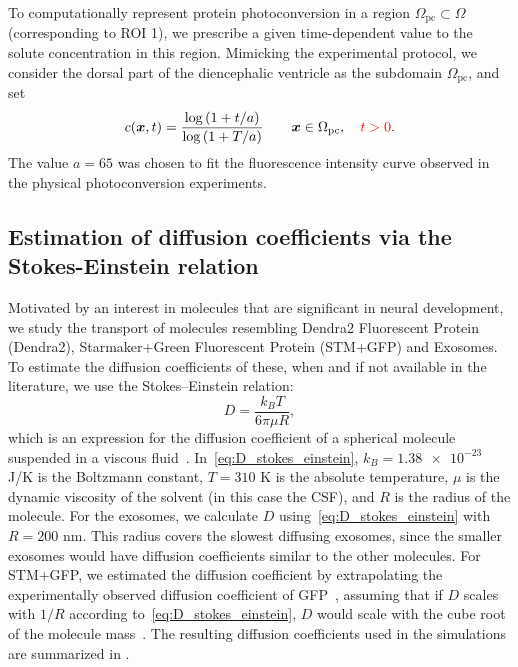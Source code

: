 \documentclass[fleqn]{wlscirep}
\newcommand{\xx}{\bm{x}}
\newcommand{\fixme}[1]{\textcolor{red}{#1}}
\begin{document}
To computationally represent protein photoconversion in a region $\Omega_{\mathrm{pc}} \subset \Omega$ (corresponding to ROI 1), we prescribe a given time-dependent value to the solute concentration in this region. 
Mimicking the experimental protocol, we consider the dorsal part of the diencephalic ventricle as the subdomain $\Omega_{\mathrm{pc}}$, and set
\begin{equation}
  c(\xx, t)=\frac{\log{(1+t/a)}}{\log{(1+T/a)}}
  \qquad \xx \in \Omega_{\mathrm{pc}}, \quad \fixme{t > 0}.
\label{eq:photoconversion_curve}
\end{equation}
The value $a=65$ was chosen to fit the fluorescence intensity curve observed in the physical photoconversion experiments.

\subsection*{Estimation of diffusion coefficients via the Stokes-Einstein relation}
Motivated by an interest in molecules that are significant in neural development, we study the transport of molecules resembling Dendra2 Fluorescent Protein (Dendra2), Starmaker+Green Fluorescent Protein (STM+GFP) and Exosomes.
To estimate the diffusion coefficients of these, when and if not available in the literature, we use the Stokes--Einstein relation:
\begin{equation}
    D = \frac{k_B T}{6\pi \mu R},
    \label{eq:D_stokes_einstein}
\end{equation}
which is an expression for the diffusion coefficient of a spherical molecule suspended in a viscous fluid~\cite{Einstein1905UberTeilchen}.
In~\eqref{eq:D_stokes_einstein}, $k_B = \num{1.38e-23}$ J/K is the Boltzmann constant, $T = 310$ K is the absolute temperature, $\mu$ is the dynamic viscosity of the solvent (in this case the CSF), and $R$ is the radius of the molecule.
For the exosomes, we calculate $D$ using~\eqref{eq:D_stokes_einstein} with $R=200$ nm. This radius covers the slowest diffusing exosomes, since the smaller exosomes would have diffusion coefficients similar to the other molecules.
For STM+GFP, we estimated the diffusion coefficient by extrapolating the experimentally observed diffusion coefficient of GFP~\cite{Swaminathan1997PhotobleachingDiffusion, Potma2001ReducedCells},
assuming that if $D$ scales with $1/R$ according to~\eqref{eq:D_stokes_einstein}, $D$ would scale with the cube root of the molecule mass~\cite{Goodhill1997DiffusionGuidance}.
The resulting diffusion coefficients used in the simulations are summarized in .
\end{document}

